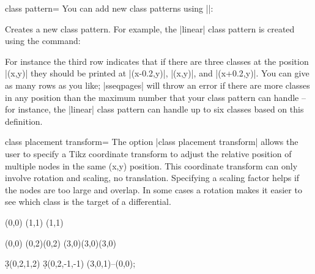 \documentclass{ltxdoc}
\begin{document}
\begin{sseqdata}[name=ex1,degree={#1}{1-#1}]
\begin{key}{class pattern=}
You can add new class patterns using |\sseqnewclasspattern|:
\begin{command}{\sseqnewclasspattern{}}
Creates a new class pattern. For example, the |linear| class pattern is created using the command:
\begin{codeexample}
\end{codeexample}
For instance the third row indicates that if there are three classes at the position |(x,y)| they should be printed at |(x-0.2,y)|, |(x,y)|, and |(x+0.2,y)|. You can give as many rows as you like; |sseqpages| will throw an error if there are more classes in any position than the maximum number that your class pattern can handle -- for instance, the |linear| class pattern can handle up to six classes based on this definition.
\end{command}
\end{key}


\begin{key}{class placement transform=}
The option |class placement transform| allows the user to specify a Tikz coordinate transform to adjust the relative position of multiple nodes in the same (x,y) position. This coordinate transform can only involve rotation and scaling, no translation. Specifying a scaling factor helps if the nodes are too large and overlap. In some cases a rotation makes it easier to see which class is the target of a differential.
\begin{codeexample}[width=5cm]
\begin{sseqpage}[classes={draw=none},class placement transform={xscale=3},
                 math nodes, xscale=2, x axis extend end=0.7cm]
\class["\mathbb{Z}"](0,0)
\class["\mathbb{Z}/2"](1,1)
\class["\mathbb{Z}/3"](1,1)
\end{sseqpage}
\end{codeexample}
\begin{codeexample}[width=5cm]
\begin{sseqpage}[classes=fill,class placement transform={rotate=40},
                 cohomological Serre grading,differentials=blue,scale=0.7]
\class(0,0)
\class(0,2)\class(0,2)
\class[red](3,0)\class[green](3,0)\class[blue](3,0)

\d3(0,2,1,2)
\d3(0,2,-1,-1)
\draw[->,red](3,0,1)--(0,0);
\end{sseqpage}
\end{codeexample}
\end{key}


\end{sseqdata}
\end{document}

